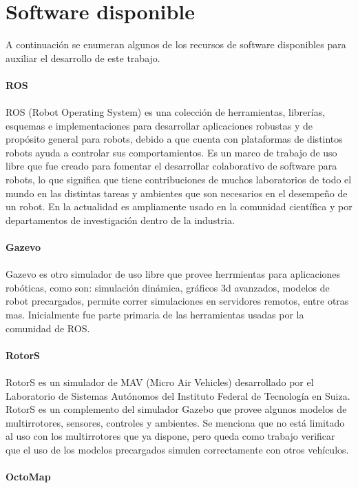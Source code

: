 \documentclass[]{report}
\begin{document}
\section{Software disponible}
A continuación se enumeran algunos de los recursos de software disponibles para auxiliar el desarrollo de este trabajo.\\\\
\textbf{ROS}\\\\
ROS (Robot Operating System) es una colección de herramientas, librerías, esquemas e implementaciones para desarrollar aplicaciones robustas y de propósito general para robots, debido a que cuenta con plataformas de distintos robots ayuda a controlar sus comportamientos. Es un marco de trabajo de uso libre que fue creado para fomentar el desarrollar colaborativo de software para robots, lo que significa que tiene contribuciones de muchos laboratorios de todo el mundo en las distintas tareas y ambientes que son necesarios en el desempeño de un robot. En la actualidad es ampliamente usado en la comunidad científica y por departamentos de investigación dentro de la industria.\\\\
\textbf{Gazevo}\\\\
Gazevo es otro simulador  de uso libre que provee herrmientas para aplicaciones robóticas, como son: simulación dinámica, gráficos 3d avanzados, modelos de robot precargados, permite correr simulaciones en servidores remotos, entre otras mas. Inicialmente fue parte primaria de las herramientas usadas por la comunidad de ROS.\\\\ 
\textbf{RotorS}\\\\
RotorS es un simulador de MAV (Micro Air Vehicles) desarrollado por el Laboratorio de Sistemas Autónomos del Instituto Federal de Tecnología en Suiza. RotorS es un complemento del simulador Gazebo que provee algunos modelos de multirrotores, sensores, controles y ambientes. Se menciona que no está limitado al uso con los multirrotores que ya dispone, pero queda como trabajo verificar que el uso de los modelos precargados simulen correctamente con otros vehículos.\\\\
\textbf{OctoMap}\\\\
\end{document}
